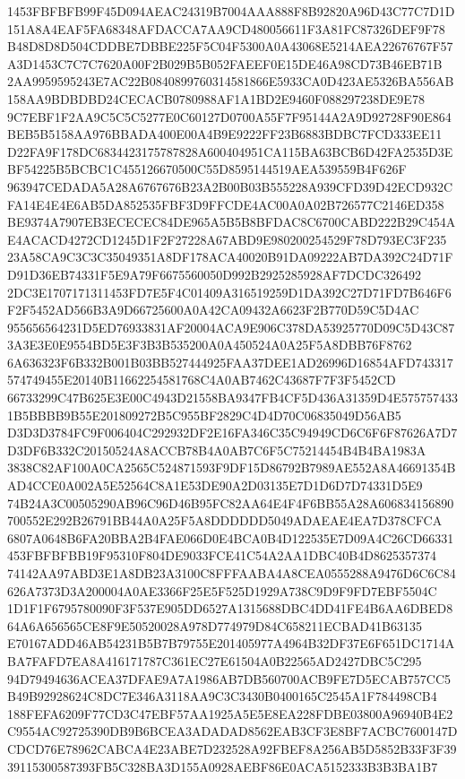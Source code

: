 \documentclass[UTF8,fontset=fandol,zihao=-4,a4paper]{ctexart}
\begin{document}
{{1453FBFBFB99F45D094AEAC24319B7004AAA888F8B92820A96D43C77C7D1D151A8A4EAF5FA68348AFDACCA7AA9CD480056611F3A81FC87326DEF9F78
B48D8D8D504CDDBE7DBBE225F5C04F5300A0A43068E5214AEA22676767F57A3D1453C7C7C7620A00F2B029B5B052FAEEF0E15DE46A98CD73B46EB71B
2AA9959595243E7AC22B0840899760314581866E5933CA0D423AE5326BA556AB158AA9BDBDBD24CECACB0780988AF1A1BD2E9460F088297238DE9E78
9C7EBF1F2AA9C5C5C5277E0C60127D0700A55F7F95144A2A9D92728F90E864BEB5B5158AA976BBADA400E00A4B9E9222FF23B6883BDBC7FCD333EE11
D22FA9F178DC6834423175787828A600404951CA115BA63BCB6D42FA2535D3EBF54225B5BCBC1C455126670500C55D8595144519AEA539559B4F626F
963947CEDADA5A28A6767676B23A2B00B03B555228A939CFD39D42ECD932CFA14E4E4E6AB5DA852535FBF3D9FFCDE4AC00A0A02B726577C2146ED358
BE9374A7907EB3ECECEC84DE965A5B5B8BFDAC8C6700CABD222B29C454AE4ACACD4272CD1245D1F2F27228A67ABD9E980200254529F78D793EC3F235
23A58CA9C3C3C35049351A8DF178ACA40020B91DA09222AB7DA392C24D71FD91D36EB74331F5E9A79F6675560050D992B2925285928AF7DCDC326492
2DC3E1707171311453FD7E5F4C01409A316519259D1DA392C27D71FD7B646F6F2F5452AD566B3A9D66725600A0A42CA09432A6623F2B770D59C5D4AC
955656564231D5ED76933831AF20004ACA9E906C378DA53925770D09C5D43C873A3E3E0E9554BD5E3F3B3B535200A0A450524A0A25F5A8DBB76F8762
6A636323F6B332B001B03BB527444925FAA37DEE1AD26996D16854AFD743317574749455E20140B11662254581768C4A0AB7462C43687F7F3F5452CD
66733299C47B625E3E00C4943D21558BA9347FB4CF5D436A31359D4E5757574331B5BBBB9B55E201809272B5C955BF2829C4D4D70C06835049D56AB5
D3D3D3784FC9F006404C292932DF2E16FA346C35C94949CD6C6F6F87626A7D7D3DF6B332C20150524A8ACCB78B4A0AB7C6F5C75214454B4B4BA1983A
3838C82AF100A0CA2565C524871593F9DF15D86792B7989AE552A8A46691354BAD4CCE0A002A5E52564C8A1E53DE90A2D03135E7D1D6D7D74331D5E9
74B24A3C00505290AB96C96D46B95FC82AA64E4F4F6BB55A28A606834156890700552E292B26791BB44A0A25F5A8DDDDDD5049ADAEAE4EA7D378CFCA
6807A0648B6FA20BBA2B4FAE066D0E4BCA0B4D122535E7D09A4C26CD66331453FBFBFBB19F95310F804DE9033FCE41C54A2AA1DBC40B4D8625357374
74142AA97ABD3E1A8DB23A3100C8FFFAABA4A8CEA0555288A9476D6C6C84626A7373D3A200004A0AE3366F25E5F525D1929A738C9D9F9FD7EBF5504C
1D1F1F6795780090F3F537E905DD6527A1315688DBC4DD41FE4B6AA6DBED864A6A656565CE8F9E50520028A978D774979D84C658211ECBAD41B63135
E70167ADD46AB54231B5B7B79755E201405977A4964B32DF37E6F651DC1714ABA7FAFD7EA8A416171787C361EC27E61504A0B22565AD2427DBC5C295
94D79494636ACEA37DFAE9A7A1986AB7DB560700ACB9FE7D5ECAB757CC5B49B92928624C8DC7E346A3118AA9C3C3430B0400165C2545A1F784498CB4
188FEFA6209F77CD3C47EBF57AA1925A5E5E8EA228FDBE03800A96940B4E2C9554AC92725390DB9B6BCEA3ADADAD8562EAB3CF3E8BF7ACBC7600147D
CDCD76E78962CABCA4E23ABE7D232528A92FBEF8A256AB5D5852B33F3F3939115300587393FB5C328BA3D155A0928AEBF86E0ACA5152333B3B3BA1B7
}}
\end{document}
